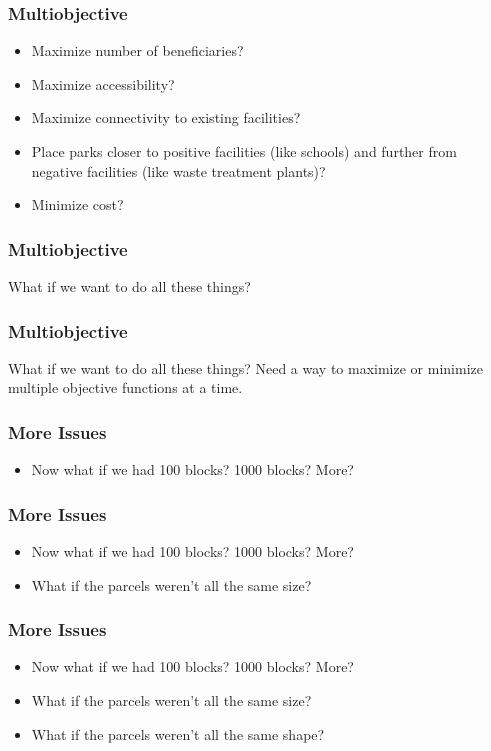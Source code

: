 \documentclass[10pt, compress]{beamer}
\begin{document}
\begin{frame}[fragile]
\frametitle{Multiobjective}
\begin{itemize}
\item Maximize number of beneficiaries?
\item Maximize accessibility?
\item Maximize connectivity to existing facilities?
\item Place parks closer to positive facilities (like schools) and further from negative facilities (like waste treatment plants)?
\item Minimize cost?
\end{itemize}
\end{frame}

\begin{frame}[fragile]
\frametitle{Multiobjective}
\begin{block}{What if we want to do all these things?}
\end{block}
\end{frame}

\begin{frame}[fragile]
\frametitle{Multiobjective}
\begin{block}{What if we want to do all these things?}
Need a way to maximize or minimize multiple objective functions at a time.
\end{block}
\end{frame}

\begin{frame}[fragile]
\frametitle{More Issues}
\begin{itemize}
\item Now what if we had 100 blocks? 1000 blocks? More?
\end{itemize}
\end{frame}

\begin{frame}[fragile]
\frametitle{More Issues}
\begin{itemize}
\item Now what if we had 100 blocks? 1000 blocks? More?
\item What if the parcels weren't all the same size?
\end{itemize}
\end{frame}

\begin{frame}[fragile]
\frametitle{More Issues}
\begin{itemize}
\item Now what if we had 100 blocks? 1000 blocks? More?
\item What if the parcels weren't all the same size?
\item What if the parcels weren't all the same shape?
\end{itemize}
\end{frame}
\end{document}

